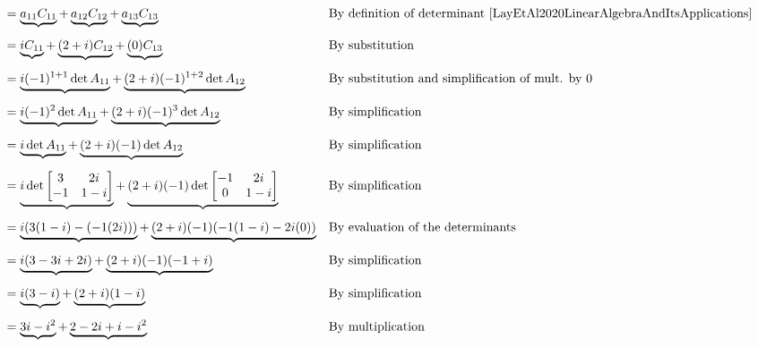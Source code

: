 \documentclass[10pt,letterpaper,final]{report}
\newcommand{\reason}[1]{&& \text{#1}}
\begin{document}
\begin{enumerate}[label=(\alph*)]
\begin{align*}
                 & = \underbrace{a_{11}C_{11}} + \underbrace{a_{12}C_{12}} + \underbrace{a_{13}C_{13}} \reason{By definition of determinant \cite[Ch. 3.1, p.173]{LayEtAl2020LinearAlgebraAndItsApplications}} \\[1ex]
                 & = \underbrace{iC_{11}} + \underbrace{(2 + i)C_{12}} + \underbrace{(0)C_{13}} \reason{By substitution}                                                                                       \\[1ex]
                 & = \underbrace{i(-1)^{1+1}\det A_{11}} + \underbrace{(2 + i)(-1)^{1+2}\det A_{12}} \reason{By substitution and simplification of mult. by 0}                                                 \\[1ex]
                 & = \underbrace{i(-1)^{2}\det A_{11}} + \underbrace{(2 + i)(-1)^{3}\det A_{12}} \reason{By simplification}                                                                                    \\[1ex]
                 & = \underbrace{i\det A_{11}} + \underbrace{(2 + i)(-1)\det A_{12}} \reason{By simplification}                                                                                                \\[1ex]
                 & = \underbrace{i\det \begin{bmatrix}3 & 2i \\-1 & 1-i\end{bmatrix}} + \underbrace{(2 + i)(-1)\det \begin{bmatrix}-1 & 2i \\0 & 1-i\end{bmatrix}} \reason{By simplification}                  \\[1ex]
                 & = \underbrace{i(3(1-i) - (-1(2i)))} + \underbrace{(2 + i)(-1)(-1(1-i)-2i(0))} \reason{By evaluation of the determinants}                                                                    \\[1ex]
                 & = \underbrace{i(3 - 3i + 2i)} + \underbrace{(2 + i)(-1)(-1 + i)} \reason{By simplification}                                                                                                 \\[1ex]
                 & = \underbrace{i(3 - i)} + \underbrace{(2 + i)(1 - i)} \reason{By simplification}                                                                                                            \\[1ex]
                 & = \underbrace{3i - i^2} + \underbrace{2 - 2i + i - i^2} \reason{By multiplication}                                                                                                          \\[1ex]

\end{align*}
\end{enumerate}
\end{document}
